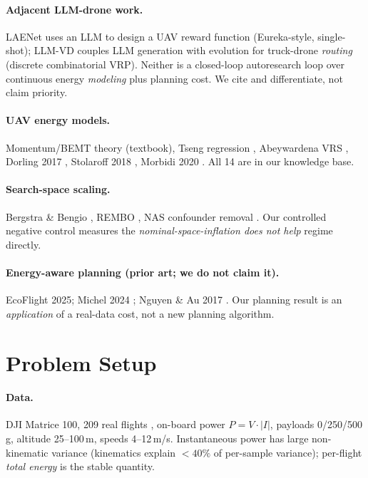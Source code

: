\documentclass{article}
\begin{document}
\paragraph{Adjacent LLM-drone work.} LAENet \citep{laenet} uses an LLM to design a UAV
reward function (Eureka-style, single-shot); LLM-VD couples LLM generation with evolution
for truck-drone \emph{routing} (discrete combinatorial VRP). Neither is a closed-loop
autoresearch loop over continuous energy \emph{modeling} plus planning cost. We cite and
differentiate, not claim priority.

\paragraph{UAV energy models.} Momentum/BEMT theory (textbook), Tseng regression
\citep{muli2022}, Abeywardena VRS \citep{abeywardena}, Dorling 2017 \citep{dorling},
Stolaroff 2018 \citep{stolaroff}, Morbidi 2020 \citep{morbidi}. All 14 are in our
knowledge base.

\paragraph{Search-space scaling.} Bergstra \& Bengio \citep{bergstra2012}, REMBO
\citep{rembo}, NAS confounder removal \citep{sciuto2019}. Our controlled negative control
measures the \emph{nominal-space-inflation does not help} regime directly.

\paragraph{Energy-aware planning (prior art; we do not claim it).} EcoFlight 2025;
Michel 2024 \citep{michel2024}; Nguyen \& Au 2017 \citep{nguyen2017}. Our planning result
is an \emph{application} of a real-data cost, not a new planning algorithm.

\section{Problem Setup}
\label{sec:setup}

\paragraph{Data.} DJI Matrice 100, 209 real flights \citep{rodrigues2021}, on-board power
$P = V\cdot|I|$, payloads 0/250/500\,g, altitude 25--100\,m, speeds 4--12\,m/s.
Instantaneous power has large non-kinematic variance (kinematics explain $<40\%$ of
per-sample variance); per-flight \emph{total energy} is the stable quantity.
\end{document}
